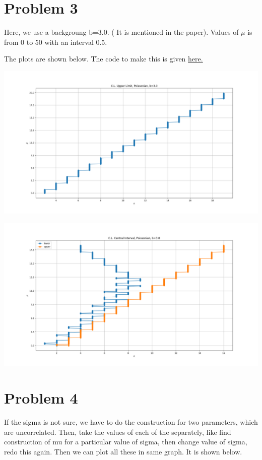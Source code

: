 \documentclass[a4paper,11pt]{article}
\begin{document}
\section*{Problem 3}
\label{sec:org94dfdc8}
Here, we use a backgroung b=3.0. ( It is mentioned in the paper). Values of \(\mu\) is from 0 to 50 with an interval 0.5.

The plots are shown below. The code to make this is given \href{https://github.com/varghesereji/Coursework\_assignments/blob/main/APP/Ass2/Problem\_3.py}{here.}

\begin{center}
\includegraphics[width=.9\linewidth]{pr3_ul.png}
\end{center}

\begin{center}
\includegraphics[width=.9\linewidth]{pr3_cl.png}
\end{center}

\section*{Problem 4}
\label{sec:orga8ecb63}
If the sigma is not sure, we have to do the construction for two parameters, which are uncorrelated. Then, take the values of each of the separately, like find construction of mu for a particular value of sigma, then change value of sigma, redo this again. Then we can plot all these in same graph. It is shown below.
\end{document}
